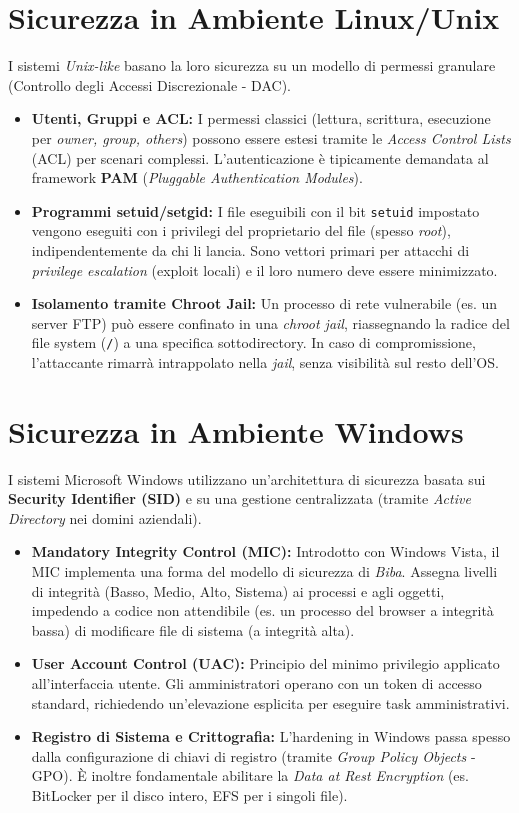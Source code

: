 \section{Sicurezza in Ambiente Linux/Unix}
I sistemi \textit{Unix-like} basano la loro sicurezza su un modello di permessi granulare (Controllo degli Accessi Discrezionale - DAC).

\begin{itemize}
    \item \textbf{Utenti, Gruppi e ACL:} I permessi classici (lettura, scrittura, esecuzione per \textit{owner, group, others}) possono essere estesi tramite le \textit{Access Control Lists} (ACL) per scenari complessi. L'autenticazione è tipicamente demandata al framework \textbf{PAM} (\textit{Pluggable Authentication Modules}).
    \item \textbf{Programmi setuid/setgid:} I file eseguibili con il bit \texttt{setuid} impostato vengono eseguiti con i privilegi del proprietario del file (spesso \textit{root}), indipendentemente da chi li lancia. Sono vettori primari per attacchi di \textit{privilege escalation} (exploit locali) e il loro numero deve essere minimizzato.
    \item \textbf{Isolamento tramite Chroot Jail:} Un processo di rete vulnerabile (es. un server FTP) può essere confinato in una \textit{chroot jail}, riassegnando la radice del file system (\texttt{/}) a una specifica sottodirectory. In caso di compromissione, l'attaccante rimarrà intrappolato nella \textit{jail}, senza visibilità sul resto dell'OS.
\end{itemize}



\section{Sicurezza in Ambiente Windows}
I sistemi Microsoft Windows utilizzano un'architettura di sicurezza basata sui \textbf{Security Identifier (SID)} e su una gestione centralizzata (tramite \textit{Active Directory} nei domini aziendali).

\begin{itemize}
    \item \textbf{Mandatory Integrity Control (MIC):} Introdotto con Windows Vista, il MIC implementa una forma del modello di sicurezza di \textit{Biba}. Assegna livelli di integrità (Basso, Medio, Alto, Sistema) ai processi e agli oggetti, impedendo a codice non attendibile (es. un processo del browser a integrità bassa) di modificare file di sistema (a integrità alta).
    \item \textbf{User Account Control (UAC):} Principio del minimo privilegio applicato all'interfaccia utente. Gli amministratori operano con un token di accesso standard, richiedendo un'elevazione esplicita per eseguire task amministrativi.
    \item \textbf{Registro di Sistema e Crittografia:} L'hardening in Windows passa spesso dalla configurazione di chiavi di registro (tramite \textit{Group Policy Objects} - GPO). È inoltre fondamentale abilitare la \textit{Data at Rest Encryption} (es. BitLocker per il disco intero, EFS per i singoli file).
\end{itemize}

